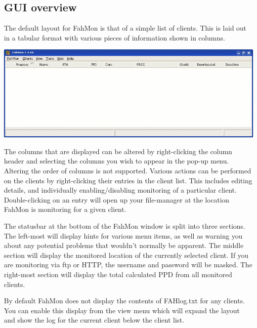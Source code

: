 \subsection{GUI overview}

The default layout for FahMon is that of a simple list of clients. This is laid
out in a tabular format with various pieces of information shown in columns.

\begin{center}
 \includegraphics[width=15cm]{2.png}
\end{center}

The columns that are displayed can be altered by right-clicking the column
header and selecting the columns you wish to appear in the pop-up menu. Altering
the order of columns is not supported. Various actions can be performed on the
clients by right-clicking their entries in the client list. This includes
editing details, and individually enabling/disabling monitoring of a particular
client. Double-clicking on an entry will open up your file-manager at the
location FahMon is monitoring for a given client.

The statusbar at the bottom of the FahMon window is split into three sections.
The left-most will display hints for various menu items, as well as warning you
about any potential problems that wouldn't normally be apparent. The middle
section will display the monitored location of the currently selected client. If
you are monitoring via ftp or HTTP, the username and password will be masked.
The right-most section will display the total calculated PPD from all monitored
clients.

By default FahMon does not display the contents of FAHlog.txt for any clients.
You can enable this display from the view menu which will expand the layout and
show the log for the current client below the client list.

